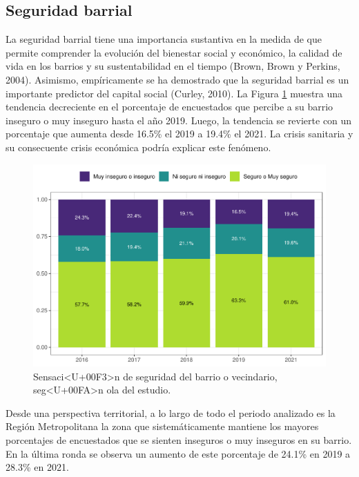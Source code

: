 \documentclass[
  12pt,
]{book}
\begin{document}
\hypertarget{seguridad-barrial}{%
\subsection*{Seguridad barrial}\label{seguridad-barrial}}

La seguridad barrial tiene una importancia sustantiva en la medida de que permite comprender la evolución del bienestar social y económico, la calidad de vida en los barrios y su sustentabilidad en el tiempo (Brown, Brown y Perkins, 2004). Asimismo, empíricamente se ha demostrado que la seguridad barrial es un importante predictor del capital social (Curley, 2010).
La Figura \ref{fig:seguri-ola} muestra una tendencia decreciente en el porcentaje de encuestados que percibe a su barrio inseguro o muy inseguro hasta el año 2019. Luego, la tendencia se revierte con un porcentaje que aumenta desde 16.5\% el 2019 a 19.4\% el 2021. La crisis sanitaria y su consecuente crisis económica podría explicar este fenómeno.

\begin{figure}

{\centering \includegraphics{reporte-elsoc_files/figure-latex/seguri-ola-1} 

}

\caption{Sensaci<U+00F3>n de seguridad del barrio o vecindario, seg<U+00FA>n ola del estudio.}\label{fig:seguri-ola}
\end{figure}

Desde una perspectiva territorial, a lo largo de todo el periodo analizado es la Región Metropolitana la zona que sistemáticamente mantiene los mayores porcentajes de encuestados que se sienten inseguros o muy inseguros en su barrio. En la última ronda se observa un aumento de este porcentaje de 24.1\% en 2019 a 28.3\% en 2021.
\end{document}

